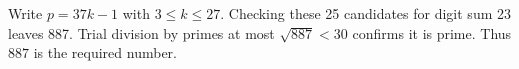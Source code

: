 Write $p=37k-1$ with $3\le k\le27$. Checking these 25 candidates for digit sum 23 leaves 887. Trial division by primes at most $\sqrt{887}<30$ confirms it is prime. Thus $\boxed{887}$ is the required number.

